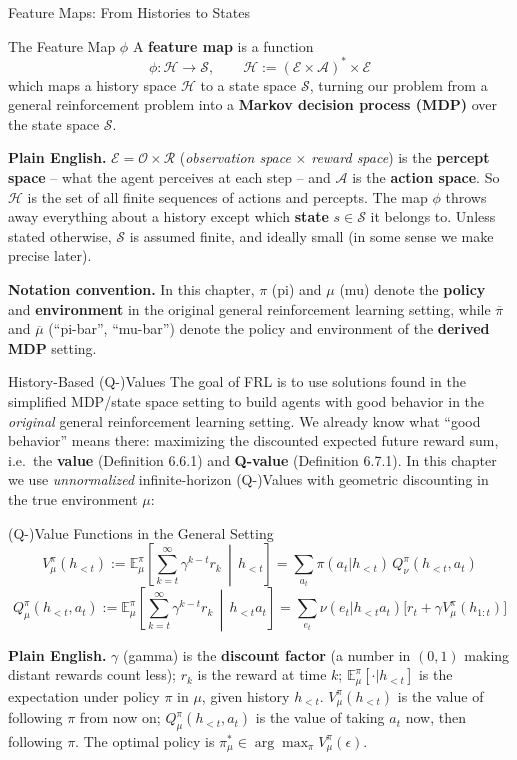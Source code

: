 \documentclass[aspectratio=169,10pt]{beamer}
\newcommand{\E}{\mathbb{E}}
\newcommand{\Hc}{\mathcal{H}}
\newcommand{\Sc}{\mathcal{S}}
\newcommand{\Ac}{\mathcal{A}}
\newcommand{\Ec}{\mathcal{E}}
\newcommand{\Oc}{\mathcal{O}}
\newcommand{\Rc}{\mathcal{R}}
\newcommand{\hlt}{h_{<t}}
\begin{document}
\begin{frame}{Feature Maps: From Histories to States}
  \begin{block}{The Feature Map $\phi$}
    A \textbf{feature map} is a function
    \[
      \phi:\Hc\to\Sc, \qquad \Hc:=(\Ec\times\Ac)^*\times\Ec
    \]
    which maps a history space $\Hc$ to a state space $\Sc$, turning our
    problem from a general reinforcement problem into a \textbf{Markov
    decision process (MDP)} over the state space $\Sc$.
  \end{block}
  \textbf{Plain English.} $\Ec=\Oc\times\Rc$ (\textit{observation space}
  $\times$ \textit{reward space}) is the \textbf{percept space} -- what the
  agent perceives at each step -- and $\Ac$ is the \textbf{action space}.
  So $\Hc$ is the set of all finite sequences of actions and percepts. The
  map $\phi$ throws away everything about a history except which
  \textbf{state} $s\in\Sc$ it belongs to. Unless stated otherwise, $\Sc$ is
  assumed finite, and ideally small (in some sense we make precise later).

  \vspace{0.4em}
  \textbf{Notation convention.} In this chapter, $\pi$ (pi) and $\mu$ (mu)
  denote the \textbf{policy} and \textbf{environment} in the original
  general reinforcement learning setting, while $\overline{\pi}$ and
  $\overline{\mu}$ (``pi-bar'', ``mu-bar'') denote the policy and
  environment of the \textbf{derived MDP} setting.
\end{frame}

\begin{frame}{History-Based (Q-)Values}
  The goal of FRL is to use solutions found in the simplified MDP/state
  space setting to build agents with good behavior in the \emph{original}
  general reinforcement learning setting. We already know what ``good
  behavior'' means there: maximizing the discounted expected future reward
  sum, i.e.\ the \textbf{value} (Definition 6.6.1) and \textbf{Q-value}
  (Definition 6.7.1). In this chapter we use \emph{unnormalized}
  infinite-horizon (Q-)Values with geometric discounting in the true
  environment $\mu$:
  \begin{block}{(Q-)Value Functions in the General Setting}
    \[
      V_\mu^\pi(\hlt) := \E^\pi_\mu\!\left[\sum_{k=t}^\infty \gamma^{k-t} r_k \,\middle|\, \hlt\right]
      = \sum_{a_t}\pi(a_t|\hlt)\,Q_\nu^\pi(\hlt,a_t)
    \]
    \[
      Q_\mu^\pi(\hlt,a_t) := \E^\pi_\mu\!\left[\sum_{k=t}^\infty \gamma^{k-t} r_k \,\middle|\, \hlt a_t\right]
      = \sum_{e_t}\nu(e_t|\hlt a_t)\big[r_t+\gamma V_\mu^\pi(h_{1:t})\big]
    \]
  \end{block}
  \textbf{Plain English.} $\gamma$ (gamma) is the \textbf{discount factor}
  (a number in $(0,1)$ making distant rewards count less); $r_k$ is the
  reward at time $k$; $\E^\pi_\mu[\cdot|\hlt]$ is the expectation under
  policy $\pi$ in $\mu$, given history $\hlt$. $V^\pi_\mu(\hlt)$ is the
  value of following $\pi$ from now on; $Q^\pi_\mu(\hlt,a_t)$ is the value
  of taking $a_t$ now, then following $\pi$. The optimal policy is
  $\pi_\mu^*\in\arg\max_\pi V_\mu^\pi(\epsilon)$.
\end{frame}
\end{document}
